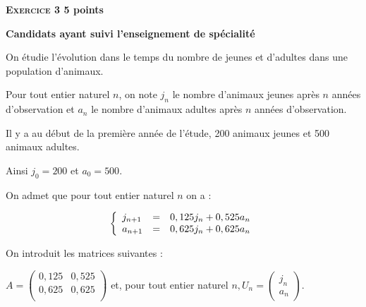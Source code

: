\documentclass[10pt]{article}
\begin{document}
\textbf{\textsc{Exercice 3} \hfill 5 points}
 
\textbf{Candidats ayant  suivi l'enseignement de spécialité}

\medskip
 
On étudie l'évolution dans le temps du nombre de jeunes et d'adultes dans une population d'animaux. 

Pour tout entier naturel $n$, on note $j_{n}$ le nombre d'animaux jeunes après $n$ années d'observation et $a_{n}$ le nombre d'animaux adultes après $n$ années d'observation. 

Il y a au début de la première année de l'étude, 200 animaux jeunes et 500 animaux adultes. 

Ainsi $j_{0} = 200$ et $a_{0} = 500$. 

On admet que pour tout entier naturel $n$ on a :
 
\[\left\{\begin{array}{l c l}
j_{n+ 1}& =&0,125j_{n} + 0,525a_{n}\\
a_{n+1} &=& 0,625j_{n} + 0,625a_{n}
\end{array}\right.\] 

On introduit les matrices suivantes : 

$A = \begin{pmatrix} 0,125 &0,525\\ 0,625& 0,625\\
\end{pmatrix}$ et, pour tout entier naturel $n, U_{n} = \begin{pmatrix}j_{n}\\a_{n}\end{pmatrix}$.

\medskip
 
\end{document}
